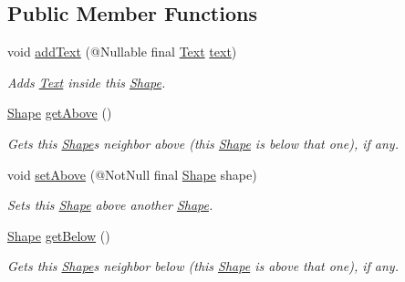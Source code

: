 \subsection*{Public Member Functions}
\begin{DoxyCompactItemize}
\item 
void \hyperlink{classcom_1_1aarrelaakso_1_1drawl_1_1_shape_af6fea9610721de462c18ee640043aba7}{add\+Text} (@Nullable final \hyperlink{classcom_1_1aarrelaakso_1_1drawl_1_1_text}{Text} \hyperlink{classcom_1_1aarrelaakso_1_1drawl_1_1_shape_ab54afc2d95d3447532f5ecf3fec3faa8}{text})
\begin{DoxyCompactList}\small\item\em Adds \hyperlink{classcom_1_1aarrelaakso_1_1drawl_1_1_text}{Text} inside this \hyperlink{classcom_1_1aarrelaakso_1_1drawl_1_1_shape}{Shape}. \end{DoxyCompactList}\item 
\hyperlink{classcom_1_1aarrelaakso_1_1drawl_1_1_shape}{Shape} \hyperlink{classcom_1_1aarrelaakso_1_1drawl_1_1_shape_acebea2aa57031322323c9bf50ee447db}{get\+Above} ()
\begin{DoxyCompactList}\small\item\em Gets this \hyperlink{classcom_1_1aarrelaakso_1_1drawl_1_1_shape}{Shape}\textquotesingle{}s neighbor above (this \hyperlink{classcom_1_1aarrelaakso_1_1drawl_1_1_shape}{Shape} is below that one), if any. \end{DoxyCompactList}\item 
void \hyperlink{classcom_1_1aarrelaakso_1_1drawl_1_1_shape_a4deb22d64fef2115a0bc4802e8dba682}{set\+Above} (@Not\+Null final \hyperlink{classcom_1_1aarrelaakso_1_1drawl_1_1_shape}{Shape} shape)
\begin{DoxyCompactList}\small\item\em Sets this \hyperlink{classcom_1_1aarrelaakso_1_1drawl_1_1_shape}{Shape} above another \hyperlink{classcom_1_1aarrelaakso_1_1drawl_1_1_shape}{Shape}. \end{DoxyCompactList}\item 
\hyperlink{classcom_1_1aarrelaakso_1_1drawl_1_1_shape}{Shape} \hyperlink{classcom_1_1aarrelaakso_1_1drawl_1_1_shape_a53de5ab609d879719cd3b372dfe8df58}{get\+Below} ()
\begin{DoxyCompactList}\small\item\em Gets this \hyperlink{classcom_1_1aarrelaakso_1_1drawl_1_1_shape}{Shape}\textquotesingle{}s neighbor below (this \hyperlink{classcom_1_1aarrelaakso_1_1drawl_1_1_shape}{Shape} is above that one), if any. \end{DoxyCompactList}\item 

\end{DoxyCompactItemize}
